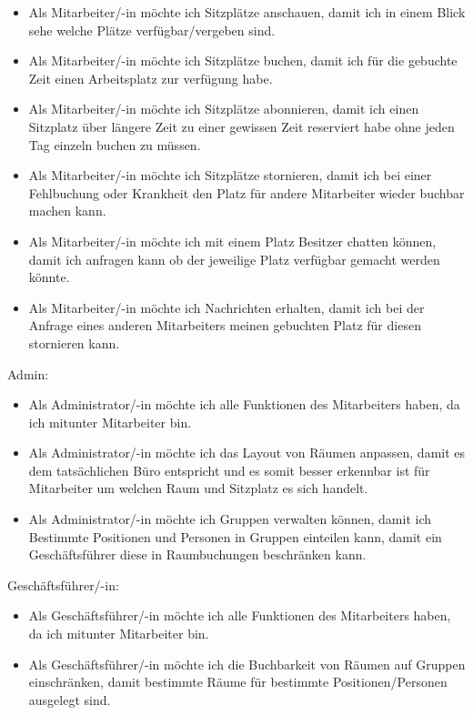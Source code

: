 \documentclass{article}
\begin{document}
\begin{itemize}
    \item Als Mitarbeiter/-in möchte ich Sitzplätze anschauen, damit ich in einem Blick sehe welche Plätze verfügbar/vergeben sind.

    \item Als Mitarbeiter/-in möchte ich Sitzplätze buchen, damit ich für die gebuchte Zeit einen Arbeitsplatz zur verfügung habe.

    \item Als Mitarbeiter/-in möchte ich Sitzplätze abonnieren, damit ich einen Sitzplatz über längere Zeit zu einer gewissen Zeit reserviert habe ohne jeden Tag einzeln buchen zu müssen.

    \item Als Mitarbeiter/-in möchte ich Sitzplätze stornieren, damit ich bei einer Fehlbuchung oder Krankheit den Platz für andere Mitarbeiter wieder buchbar machen kann.

    \item Als Mitarbeiter/-in möchte ich mit einem Platz Besitzer chatten können, damit ich anfragen kann ob der jeweilige Platz verfügbar gemacht werden könnte.

    \item Als Mitarbeiter/-in möchte ich Nachrichten erhalten, damit ich bei der Anfrage eines anderen Mitarbeiters meinen gebuchten Platz für diesen stornieren kann.
\end{itemize}

\noindent Admin:

\begin{itemize}
    \item Als Administrator/-in möchte ich alle Funktionen des Mitarbeiters haben, da ich mitunter Mitarbeiter bin.

    \item Als Administrator/-in möchte ich das Layout von Räumen anpassen, damit es dem tatsächlichen Büro entspricht und es somit besser erkennbar ist für Mitarbeiter um welchen Raum und Sitzplatz es sich handelt.

    \item Als Administrator/-in möchte ich Gruppen verwalten können, damit ich Bestimmte Positionen und Personen in Gruppen einteilen kann, damit ein Geschäftsführer diese in Raumbuchungen beschränken kann.
\end{itemize}

\noindent Geschäftsführer/-in:

\begin{itemize}
    \item Als Geschäftsführer/-in möchte ich alle Funktionen des Mitarbeiters haben, da ich mitunter Mitarbeiter bin.

    \item Als Geschäftsführer/-in möchte ich die Buchbarkeit von Räumen auf Gruppen einschränken, damit bestimmte Räume für bestimmte Positionen/Personen ausgelegt sind.
\end{itemize}
\end{document}
